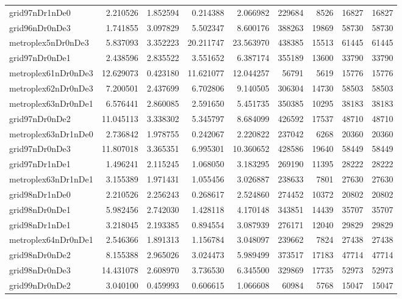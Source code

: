 \begin{longtable}{|l|r|r|r|r|r|r|r|r|}
grid97nDr1nDe0 & 2.210526 & 1.852594 & 0.214388 & 2.066982 & 229684 & 8526 & 16827 & 16827 \\
grid96nDr0nDe3 & 1.741855 & 3.097829 & 5.502347 & 8.600176 & 388263 & 19869 & 58730 & 58730 \\
metroplex5nDr0nDe3 & 5.837093 & 3.352223 & 20.211747 & 23.563970 & 438385 & 15513 & 61445 & 61445 \\
grid97nDr0nDe1 & 2.438596 & 2.835522 & 3.551652 & 6.387174 & 355189 & 13600 & 33790 & 33790 \\
metroplex61nDr0nDe3 & 12.629073 & 0.423180 & 11.621077 & 12.044257 & 56791 & 5619 & 15776 & 15776 \\
metroplex62nDr0nDe3 & 7.200501 & 2.437699 & 6.702806 & 9.140505 & 306304 & 14730 & 58503 & 58503 \\
metroplex63nDr0nDe1 & 6.576441 & 2.860085 & 2.591650 & 5.451735 & 350385 & 10295 & 38183 & 38183 \\
grid97nDr0nDe2 & 11.045113 & 3.338302 & 5.345797 & 8.684099 & 426592 & 17537 & 48710 & 48710 \\
metroplex63nDr1nDe0 & 2.736842 & 1.978755 & 0.242067 & 2.220822 & 237042 & 6268 & 20360 & 20360 \\
grid97nDr0nDe3 & 11.807018 & 3.365351 & 6.995301 & 10.360652 & 428586 & 19640 & 58449 & 58449 \\
grid97nDr1nDe1 & 1.496241 & 2.115245 & 1.068050 & 3.183295 & 269190 & 11395 & 28222 & 28222 \\
metroplex63nDr1nDe1 & 3.155389 & 1.971431 & 1.055456 & 3.026887 & 238633 & 7801 & 27630 & 27630 \\
grid98nDr1nDe0 & 2.210526 & 2.256243 & 0.268617 & 2.524860 & 274452 & 10372 & 20802 & 20802 \\
grid98nDr0nDe1 & 5.982456 & 2.742030 & 1.428118 & 4.170148 & 343851 & 14439 & 35707 & 35707 \\
grid98nDr1nDe1 & 3.218045 & 2.193385 & 0.894554 & 3.087939 & 276171 & 12040 & 29829 & 29829 \\
metroplex64nDr0nDe1 & 2.546366 & 1.891313 & 1.156784 & 3.048097 & 239662 & 7824 & 27438 & 27438 \\
grid98nDr0nDe2 & 8.155388 & 2.965026 & 3.024473 & 5.989499 & 373517 & 17183 & 47714 & 47714 \\
grid98nDr0nDe3 & 14.431078 & 2.608970 & 3.736530 & 6.345500 & 329869 & 17735 & 52973 & 52973 \\
grid99nDr0nDe2 & 3.040100 & 0.459993 & 0.606615 & 1.066608 & 60984 & 5768 & 15047 & 15047 \\

\end{longtable}
